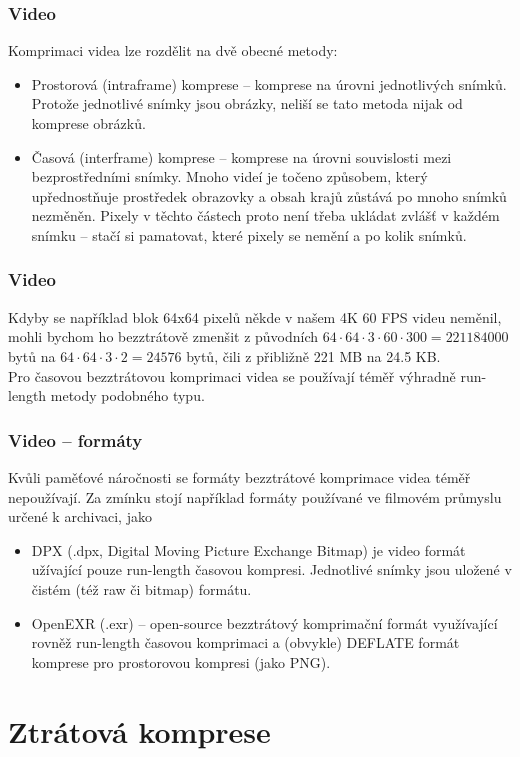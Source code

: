 \documentclass[aspectratio=169,11pt,svgnames,handout]{beamer}
\begin{document}
\begin{frame}
 \frametitle{Video}
 Komprimaci videa lze rozdělit na dvě obecné metody:
 \begin{itemize}[label=\textbullet]
  \item \alert{Prostorová} (intraframe) komprese -- komprese na úrovni
   jednotlivých snímků. Protože jednotlivé snímky jsou obrázky, neliší se tato
   metoda nijak od komprese obrázků.
  \pause
 \item \alert{Časová} (interframe) komprese -- komprese na úrovni souvislosti
  mezi bezprostředními snímky. Mnoho videí je točeno způsobem, který
  upřednostňuje prostředek obrazovky a obsah krajů zůstává po mnoho snímků
  nezměněn. \pause
  Pixely v těchto částech proto není třeba ukládat zvlášť v každém snímku --
  stačí si pamatovat, které pixely se nemění a po kolik snímků.
 \end{itemize}
\end{frame}

\begin{frame}
 \frametitle{Video}
 Kdyby se například blok 64x64 pixelů někde v našem 4K 60 FPS videu neměnil,
 mohli bychom ho bezztrátově zmenšit z původních $64 \cdot 64 \cdot 3 \cdot 60
 \cdot 300 = 221184000$ bytů na $64 \cdot 64 \cdot 3 \cdot 2 = 24576$ bytů, čili
 z přibližně 221 MB na 24.5 KB.\pause\\
 Pro \alert{časovou} bezztrátovou komprimaci videa se používají téměř výhradně
 run-length metody podobného typu.
\end{frame}

\begin{frame}
 \frametitle{Video -- formáty}
 Kvůli paměťové náročnosti se formáty bezztrátové komprimace videa téměř
 nepoužívají. \pause Za zmínku stojí například formáty používané ve filmovém
 průmyslu určené k archivaci, jako
 \begin{itemize}[label=\textbullet]
  \item \alert{DPX} (.dpx, Digital Moving Picture Exchange Bitmap) je video
   formát užívající pouze run-length časovou kompresi. Jednotlivé snímky jsou
   uložené v čistém (též raw či bitmap) formátu.
   \pause
  \item \alert{OpenEXR} (.exr) -- open-source bezztrátový komprimační formát
   využívající rovněž run-length časovou komprimaci a (obvykle) DEFLATE formát
   komprese pro prostorovou kompresi (jako PNG).
 \end{itemize}
\end{frame}

\section{Ztrátová komprese}
\label{sec:ztratova-komprese}
\end{document}
